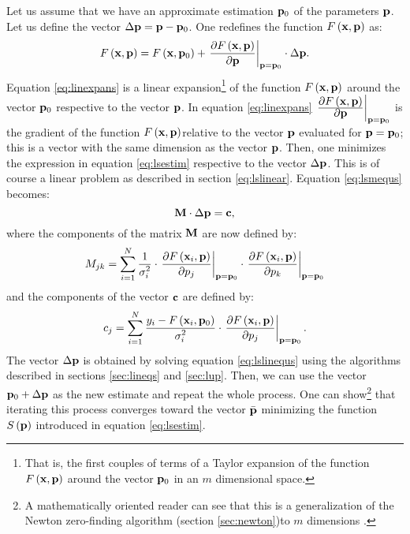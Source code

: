 \documentclass[twoside]{book}
\begin{document}
Let us assume that we have an approximate estimation ${\bf p}_0$
of the parameters ${\bf p}$. Let us define the vector $\Delta{\bf
p}={\bf p}-{\bf p}_0$. One redefines the function $F\left({\bf
x},{\bf p}\right)$ as:
\begin{equation}
\label{eq:linexpans}
  F\left({\bf x},{\bf p}\right)=F\left({\bf x},{\bf p}_0\right)
  +\left.{\displaystyle\partial F\left({\bf x},{\bf
  p}\right)\over\displaystyle\partial{\bf p}}\right|_{{\bf p}={\bf
  p}_0}\cdot \Delta{\bf p}.
\end{equation}
Equation \ref{eq:linexpans} is a linear expansion\footnote{That
is, the first couples of terms of a Taylor expansion of the
function $F\left({\bf x},{\bf p}\right)$ around the vector ${\bf
p}_0$ in an $m$ dimensional space.} of the function $F\left({\bf
x},{\bf p}\right)$ around the vector ${\bf p}_0$ respective to the
vector ${\bf p}$. In equation \ref{eq:linexpans}
$\left.{\displaystyle\partial F\left({\bf x},{\bf
p}\right)\over\displaystyle\partial{\bf p}}\right|_{{\bf p}={\bf
p}_0}$ is the gradient of the function $F\left({\bf x},{\bf
p}\right)$relative to the vector ${\bf p}$ evaluated for ${\bf
p}={\bf p}_0$; this is a vector with the same dimension as the
vector ${\bf p}$. Then, one minimizes the expression in equation
\ref{eq:lsestim} respective to the vector $\Delta{\bf p}$. This is
of course a linear problem as described in section
\ref{eq:lslinear}. Equation \ref{eq:lsmequs} becomes:
\begin{equation}
\label{eq:lslinequs}
  {\bf M}\cdot\Delta{\bf p}={\bf c},
\end{equation}
where the components of the matrix ${\bf M}$ are now defined by:
\begin{equation}
\label{eq:lsmatrix}
  M_{jk}=\sum_{i=1}^N {\displaystyle
  1\over\displaystyle\sigma_i^2}\cdot\left.{\displaystyle\partial F\left({\bf x}_i,{\bf
p}\right)\over\displaystyle\partial p_j}\right|_{{\bf p}={\bf
p}_0}\cdot\left.{\displaystyle\partial F\left({\bf x}_i,{\bf
p}\right)\over\displaystyle\partial p_k}\right|_{{\bf p}={\bf
p}_0}
\end{equation}
and the components of the vector ${\bf c}$ are defined by:
\begin{equation}
\label{eq:lsvector}
  c_j=\sum_{i=1}^N {\displaystyle
  y_i-F\left({\bf x}_i,{\bf
p}_0\right)\over\displaystyle\sigma_i^2}\cdot\left.{\displaystyle\partial
F\left({\bf x}_i,{\bf p}\right)\over\displaystyle\partial
p_j}\right|_{{\bf p}={\bf p}_0}.
\end{equation}
The vector $\Delta{\bf p}$ is obtained by solving equation
\ref{eq:lslinequs} using the algorithms described in sections
\ref{sec:lineqs} and \ref{sec:lup}. Then, we can use the vector
${\bf p}_0+\Delta{\bf p}$ as the new estimate and repeat the whole
process. One can show\footnote{A mathematically oriented reader
can see that this is a generalization of the Newton zero-finding
algorithm (\cf section \ref{sec:newton})to $m$ dimensions .} that
iterating this process converges toward the vector $\bar{\bf p}$
minimizing the function $S\left({\bf p}\right)$ introduced in
equation \ref{eq:lsestim}.
\end{document}
